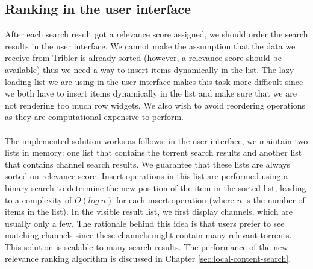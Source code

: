 \subsection{Ranking in the user interface}
After each search result got a relevance score assigned, we should order the search results in the user interface. We cannot make the assumption that the data we receive from Tribler is already sorted (however, a relevance score should be available) thus we need a way to insert items dynamically in the list. The lazy-loading list we are using in the user interface makes this task more difficult since we both have to insert items dynamically in the list and make sure that we are not rendering too much row widgets. We also wish to avoid reordering operations as they are computational expensive to perform.\\\\
The implemented solution works as follows: in the user interface, we maintain two lists in memory: one list that contains the torrent search results and another list that contains channel search results. We guarantee that these lists are always sorted on relevance score. Insert operations in this list are performed using a binary search to determine the new position of the item in the sorted list, leading to a complexity of $ O(log\ n) $ for each insert operation (where $ n $ is the number of items in the list). In the visible result list, we first display channels, which are usually only a few. The rationale behind this idea is that users prefer to see matching channels since these channels might contain many relevant torrents. This solution is scalable to many search results. The performance of the new relevance ranking algorithm is discussed in Chapter \ref{sec:local-content-search}.

